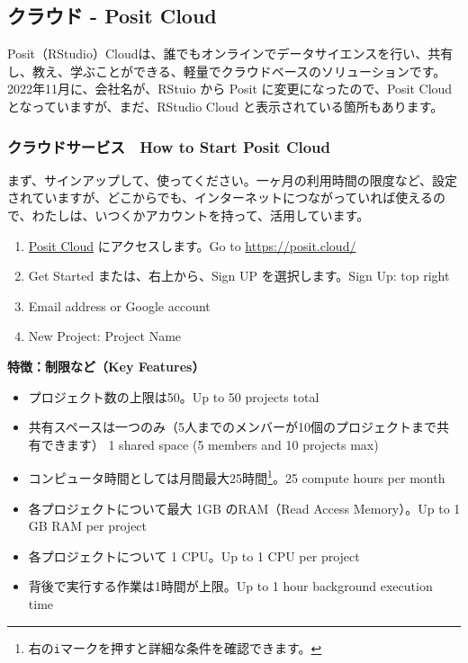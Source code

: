 \documentclass[
]{bxjsbook}
\providecommand{\tightlist}{%
  \setlength{\itemsep}{0pt}\setlength{\parskip}{0pt}}
\theoremstyle{definition}
\theoremstyle{definition}
\theoremstyle{definition}
\theoremstyle{definition}
\theoremstyle{remark}
\begin{document}
\hypertarget{positcloud}{%
\subsection{クラウド - Posit Cloud}\label{positcloud}}

Posit（RStudio）Cloudは、誰でもオンラインでデータサイエンスを行い、共有し、教え、学ぶことができる、軽量でクラウドベースのソリューションです。2022年11月に、会社名が、RStuio から Posit に変更になったので、Posit Cloud となっていますが、まだ、RStudio Cloud と表示されている箇所もあります。

\hypertarget{ux30afux30e9ux30a6ux30c9ux30b5ux30fcux30d3ux30b9-how-to-start-posit-cloud}{%
\subsubsection{クラウドサービス　How to Start Posit Cloud}\label{ux30afux30e9ux30a6ux30c9ux30b5ux30fcux30d3ux30b9-how-to-start-posit-cloud}}

まず、サインアップして、使ってください。一ヶ月の利用時間の限度など、設定されていますが、どこからでも、インターネットにつながっていれば使えるので、わたしは、いつくかアカウントを持って、活用しています。

\begin{enumerate}
\def\labelenumi{\arabic{enumi}.}
\tightlist
\item
  \href{https://posit.cloud/}{Posit Cloud} にアクセスします。Go to \url{https://posit.cloud/}
\item
  Get Started または、右上から、Sign UP を選択します。Sign Up: top right
\item
  Email address or Google account
\item
  New Project: Project Name
\end{enumerate}

\textbf{特徴：制限など（Key Features）}

\begin{itemize}
\tightlist
\item
  プロジェクト数の上限は50。Up to 50 projects total
\item
  共有スペースは一つのみ（5人までのメンバーが10個のプロジェクトまで共有できます） 1 shared space (5 members and 10 projects max)
\item
  コンピュータ時間としては月間最大25時間\footnote{右の\texttt{i}マークを押すと詳細な条件を確認できます。}。25 compute hours per month
\item
  各プロジェクトについて最大 1GB のRAM（Read Access Memory）。Up to 1 GB RAM per project
\item
  各プロジェクトについて 1 CPU。Up to 1 CPU per project
\item
  背後で実行する作業は1時間が上限。Up to 1 hour background execution time
\end{itemize}
\end{document}
